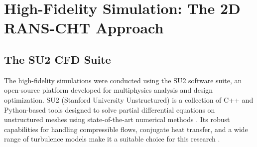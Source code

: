 \documentclass[tg, EN]{ufabcFHZh_tg}
\begin{document}



\section{High-Fidelity Simulation: The 2D RANS-CHT Approach}

\subsection{The SU2 CFD Suite}

The high-fidelity simulations were conducted using the SU2 software suite, an open-source platform developed for multiphysics analysis and design optimization. SU2 (Stanford University Unstructured) is a collection of C++ and Python-based tools designed to solve partial differential equations on unstructured meshes using state-of-the-art numerical methods \citep{economon2016}. Its robust capabilities for handling compressible flows, conjugate heat transfer, and a wide range of turbulence models make it a suitable choice for this research \citep{economon2016, palacios2022}.
\end{document}
